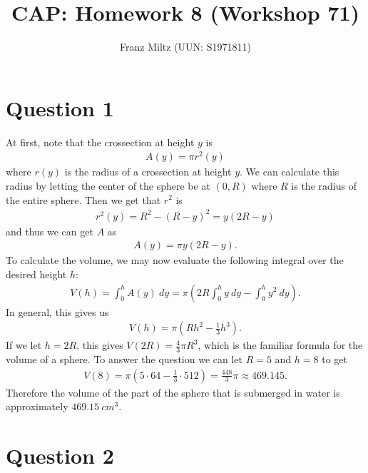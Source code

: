 \documentclass{article}
\title{CAP: Homework 8 (Workshop 71)}
\author{Franz Miltz (UUN: S1971811)}
\begin{document}
\maketitle
\section*{Question 1}
At first, note that the crossection at height $y$ is
\begin{align*}
  A(y) = \pi r^2(y)
\end{align*}
where $r(y)$ is the radius of a crossection at height $y$.
We can calculate this radius by letting the center of the sphere be at $(0, R)$ where $R$ is the radius of the entire sphere.
Then we get that $r^2$ is
\begin{align*}
  r^2(y) = R^2-(R-y)^2 = y(2R-y)
\end{align*}
and thus we can get $A$ as
\begin{align*}
  A(y) = \pi y(2R-y).
\end{align*}
To calculate the volume, we may now evaluate the following integral over the desired height $h$:
\begin{align*}
  V(h)=\int_0^h A(y)\:dy=\pi\left(2R\int_0^h y\:dy - \int_0^h y^2\:dy\right).
\end{align*}
In general, this gives us
\begin{align*}
  V(h)=\pi(Rh^2-\frac{1}{3}h^3).
\end{align*}
If we let $h=2R$, this gives $V(2R)=\frac{4}{3}\pi R^3$, which is the familiar formula for the volume of a sphere.
To answer the question we can let $R=5$ and $h=8$ to get
\begin{align*}
  V(8)=\pi(5\cdot 64-\frac{1}{3}\cdot 512) = \frac{448}{3}\pi\approx 469.145.
\end{align*}
Therefore the volume of the part of the sphere that is submerged in water is approximately $469.15\:cm^3$.
\section*{Question 2}
\end{document}
